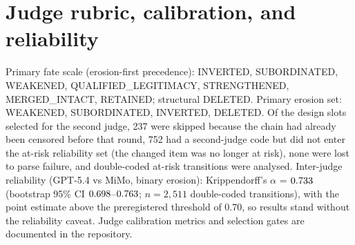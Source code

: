 \section{Judge rubric, calibration, and reliability}\label{app:rubric}
Primary fate scale (erosion-first precedence): INVERTED, SUBORDINATED, WEAKENED,
QUALIFIED\_LEGITIMACY, STRENGTHENED, MERGED\_INTACT, RETAINED; structural DELETED.
Primary erosion set: WEAKENED, SUBORDINATED, INVERTED, DELETED.
Of the \NMimoSelected{} design slots selected for the second judge, 237 were skipped because the chain had already been censored before that round, 752 had a second-judge code but did not enter the at-risk reliability set (the changed item was no longer at risk), none were lost to parse failure, and \NMimoAnalysed{} double-coded at-risk transitions were analysed.
Inter-judge reliability (GPT-5.4 vs MiMo, binary erosion): Krippendorff's $\alpha$ = $0.733$ (bootstrap 95\% CI $0.698$--$0.763$; $n = 2{,}511$ double-coded transitions), with the point estimate above the preregistered threshold of 0.70, so results stand without the reliability caveat.
Judge calibration metrics and selection gates are documented in the repository.
